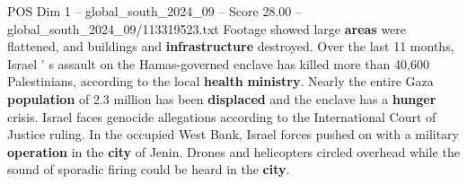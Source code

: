 \begin{textsample}{POS Dim 1 – global\_south\_2024\_09 – Score 28.00 – global\_south\_2024\_09/113319523.txt}
Footage showed large \textbf{areas} were flattened, and buildings and \textbf{infrastructure} destroyed.
Over the last 11 months, Israel ' s assault on the Hamas-governed enclave has killed more than 40,600 Palestinians, according to the local \textbf{health} \textbf{ministry}.
Nearly the entire Gaza \textbf{population} of 2.3 million has been \textbf{displaced} and the enclave has a \textbf{hunger} crisis.
Israel faces genocide allegations according to the International Court of Justice ruling.
In the occupied West Bank, Israel forces pushed on with a military \textbf{operation} in the \textbf{city} of Jenin.
Drones and helicopters circled overhead while the sound of sporadic firing could be heard in the \textbf{city}.

\end{textsample}
